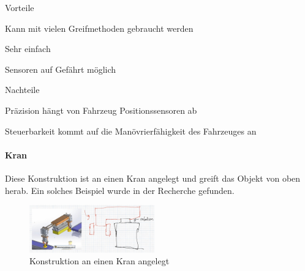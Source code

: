 \documentclass[../main.tex]{subfiles}
\begin{document}
\begin{minipage}[t]{0.48\textwidth}
    \begin{items}
          \item [Vorteile]
          \item Kann mit vielen Greifmethoden gebraucht werden
          \item Sehr einfach
          \item Sensoren auf Gefährt möglich
    \end{items}
\end{minipage}
\hfill
\begin{minipage}[t]{0.48\textwidth}
    \begin{items}
          \item [Nachteile]
          \item Präzision hängt von Fahrzeug Positionssensoren ab
          \item Steuerbarkeit kommt auf die Manövrierfähigkeit des Fahrzeuges an 
    \end{items}
\end{minipage}
\newpage
\paragraph{Kran}
Diese Konstruktion ist an einen Kran angelegt und greift das Objekt von oben herab. Ein solches Beispiel wurde in der Recherche gefunden.

\begin{figure}[H]
        \centering
        \includegraphics[width=0.48\textwidth]{img/technologierecherche/Rotation/seitlich_mit_rotation.jpg}
        \caption[Konstruktion an einen Kran angelegt]{Konstruktion an einen Kran angelegt \footnotemark} 
        \label{img:tech_seitlich_mit_rotation}
\end{figure}
\end{document}
